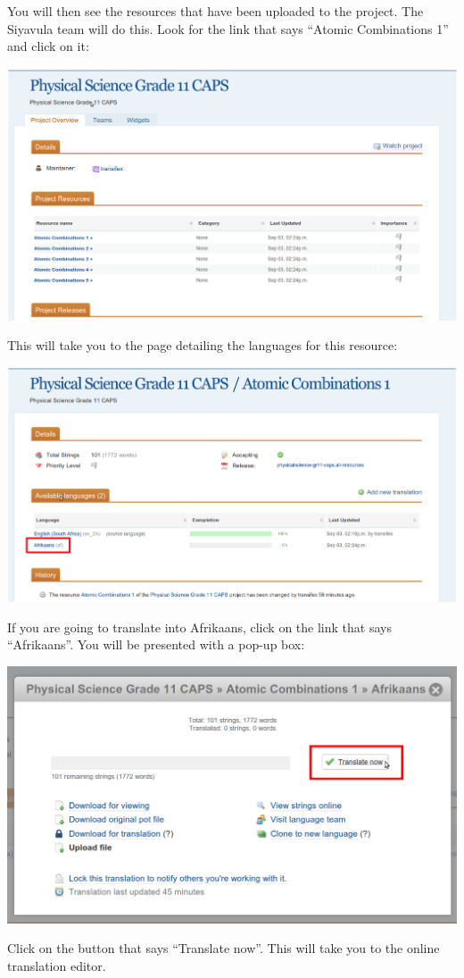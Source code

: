 \documentclass[12pt, a4paper]{article}
\begin{document}
You will then see the resources that have been uploaded to the project. The Siyavula team will do this. Look for the link that says ``Atomic Combinations 1'' and click on it:
\begin{center}
    \centerline{\includegraphics[width=0.8\paperwidth]{images/selectresource.png}}
\end{center}
This will take you to the page detailing the languages for this resource:
\begin{center}
    \centerline{\includegraphics[width=0.8\paperwidth]{images/availablelanguages.png}}
\end{center}

If you are going to translate into Afrikaans, click on the link that says ``Afrikaans''. You will be presented with a pop-up box:
\begin{center}
    \centerline{\includegraphics[width=0.8\paperwidth]{images/translatenow.png}}
\end{center}
Click on the button that says ``Translate now''. This will take you to the online translation editor.
\end{document}

